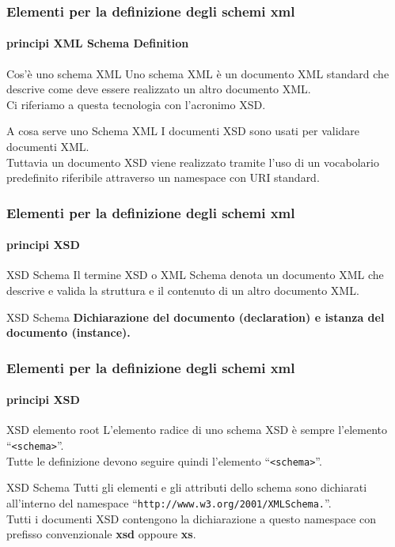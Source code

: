
\begin{frame}
	\frametitle{Elementi per la definizione degli schemi xml}
	\framesubtitle{principi XML Schema Definition}
	\addtocounter{nframe}{1}

	\begin{block}{Cos'è uno schema XML}
		Uno schema XML è un documento XML standard che descrive come deve essere realizzato un altro documento XML.
		\\ Ci riferiamo a questa tecnologia con l'acronimo XSD.
	\end{block}

	\begin{block}{A cosa serve uno Schema XML}
		I documenti XSD sono usati per validare documenti XML.
		\\ Tuttavia un documento XSD viene realizzato tramite l'uso di un vocabolario predefinito riferibile attraverso un namespace con URI standard.
	\end{block}

\end{frame}

\begin{frame}
	\frametitle{Elementi per la definizione degli schemi xml}
	\framesubtitle{principi XSD}
	\addtocounter{nframe}{1}

	\begin{block}{XSD Schema}
		Il termine XSD o XML Schema denota un documento XML che descrive e valida la struttura e il contenuto di un altro documento XML.
	\end{block}

	\begin{block}{XSD Schema}
		\textbf{Dichiarazione del documento (declaration) e istanza del documento (instance).}
	\end{block}

\end{frame}

\begin{frame}
	\frametitle{Elementi per la definizione degli schemi xml}
	\framesubtitle{principi XSD}
	\addtocounter{nframe}{1}

	\begin{block}{XSD elemento root}
		L'elemento radice di uno schema XSD è sempre l'elemento ``\texttt{<schema>}''.
		\\ Tutte le definizione devono seguire quindi l'elemento ``\texttt{<schema>}''.
	\end{block}

	\begin{block}{XSD Schema}
		Tutti gli elementi e gli attributi dello schema sono dichiarati all'interno del namespace ``\texttt{http://www.w3.org/2001/XMLSchema.}''.
		\\ Tutti i documenti XSD contengono la dichiarazione a questo namespace con prefisso convenzionale \textbf{xsd} oppoure \textbf{xs}.
	\end{block}

\end{frame}

